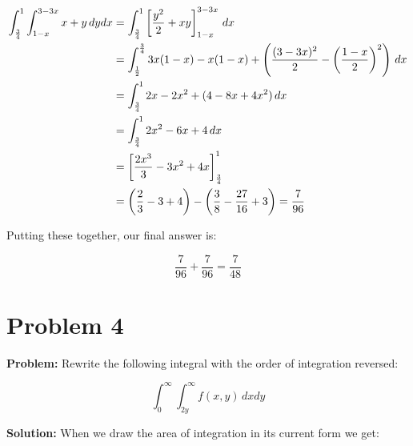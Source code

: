 \documentclass{article}
\begin{document}
\begin{align*}
    \int^{1}_{\frac{3}{4}}\int^{3-3x}_{1-x}x+y\,dydx&=\int^1_\frac{3}{4}\left[\frac{y^2}{2}+xy\right]_{1-x}^{3-3x}\,dx\\
    &=\int^\frac{3}{4}_\frac{1}{2}3x(1-x)-x(1-x)+\left(\frac{(3-3x)^2}{2}-\left(\frac{1-x}{2}\right)^2\right)\,dx\\
    &=\int^1_\frac{3}{4}2x-2x^2+(4-8x+4x^2)\,dx\\
    &=\int^1_\frac{3}{4}2x^2-6x+4\,dx\\
    &=\left[\frac{2x^3}{3}-3x^2+4x\right]_{\frac{3}{4}}^{1}\\
    &=\left(\frac{2}{3}-3+4\right)-\left(\frac{3}{8}-\frac{27}{16}+3\right)=\frac{7}{96}
\end{align*}

Putting these together, our final answer is:

$$\frac{7}{96}+\frac{7}{96}=\frac{7}{48}$$

\section*{Problem 4}
\noindent\textbf{Problem:} Rewrite the following integral with the order of integration reversed:

$$\int_0^\infty\int_{2y}^\infty f(x,y)\,dxdy$$

\noindent\textbf{Solution:} When we draw the area of integration in its current form we get:

\end{document}
